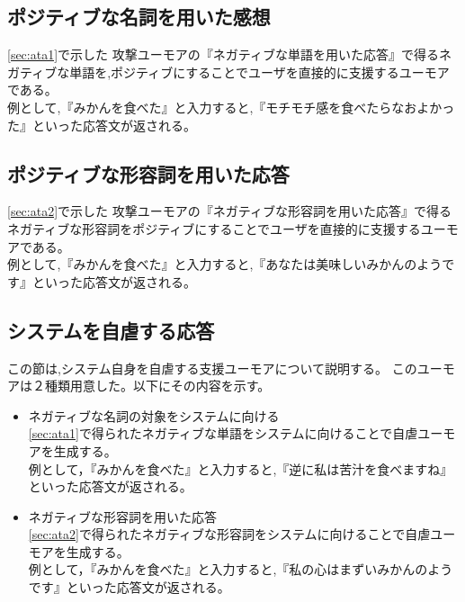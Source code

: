 \subsection{ポジティブな名詞を用いた感想}
\ref{sec:ata1}で示した
攻撃ユーモアの『ネガティブな単語を用いた応答』で得るネガティブな単語を,ポジティブにすることでユーザを直接的に支援するユーモアである。\\
\hspace{1zw}例として,『みかんを食べた』と入力すると,『モチモチ感を食べたらなおよかった』といった応答文が返される。



\subsection{ポジティブな形容詞を用いた応答}
\ref{sec:ata2}で示した
攻撃ユーモアの『ネガティブな形容詞を用いた応答』で得るネガティブな形容詞をポジティブにすることでユーザを直接的に支援するユーモアである。\\
\hspace{1zw}例として,『みかんを食べた』と入力すると,『あなたは美味しいみかんのようです』といった応答文が返される。



\subsection{システムを自虐する応答}
この節は,システム自身を自虐する支援ユーモアについて説明する。
このユーモアは２種類用意した。以下にその内容を示す。
\begin{itemize}
\item ネガティブな名詞の対象をシステムに向ける\\
\hspace{1zw}\ref{sec:ata1}で得られたネガティブな単語をシステムに向けることで自虐ユーモアを生成する。\\
\hspace{1zw}例として，『みかんを食べた』と入力すると,『逆に私は苦汁を食べますね』といった応答文が返される。

\item ネガティブな形容詞を用いた応答\\
\hspace{1zw}\ref{sec:ata2}で得られたネガティブな形容詞をシステムに向けることで自虐ユーモアを生成する。\\
\hspace{1zw}例として，『みかんを食べた』と入力すると,『私の心はまずいみかんのようです』といった応答文が返される。
\end{itemize}



